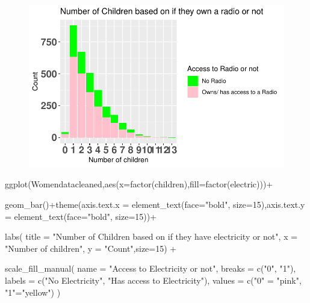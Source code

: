 \documentclass[
  letterpaper,
  DIV=11,
  numbers=noendperiod]{scrartcl}
\newenvironment{Shaded}{\begin{snugshade}}{\end{snugshade}}
\newcommand{\AttributeTok}[1]{\textcolor[rgb]{0.40,0.45,0.13}{#1}}
\newcommand{\DecValTok}[1]{\textcolor[rgb]{0.68,0.00,0.00}{#1}}
\newcommand{\FunctionTok}[1]{\textcolor[rgb]{0.28,0.35,0.67}{#1}}
\newcommand{\NormalTok}[1]{\textcolor[rgb]{0.00,0.23,0.31}{#1}}
\newcommand{\OtherTok}[1]{\textcolor[rgb]{0.00,0.23,0.31}{#1}}
\newcommand{\SpecialCharTok}[1]{\textcolor[rgb]{0.37,0.37,0.37}{#1}}
\newcommand{\StringTok}[1]{\textcolor[rgb]{0.13,0.47,0.30}{#1}}
\begin{document}
\begin{figure}[H]

{\centering \includegraphics{Fertility_Rates_Education_Impact_Botswana_files/figure-pdf/unnamed-chunk-20-1.pdf}

}

\end{figure}

\begin{Shaded}
\begin{Highlighting}[]
\FunctionTok{ggplot}\NormalTok{(Womendatacleaned,}\FunctionTok{aes}\NormalTok{(}\AttributeTok{x=}\FunctionTok{factor}\NormalTok{(children),}\AttributeTok{fill=}\FunctionTok{factor}\NormalTok{(electric)))}\SpecialCharTok{+}
  
\FunctionTok{geom\_bar}\NormalTok{()}\SpecialCharTok{+}\FunctionTok{theme}\NormalTok{(}\AttributeTok{axis.text.x =} \FunctionTok{element\_text}\NormalTok{(}\AttributeTok{face=}\StringTok{"bold"}\NormalTok{, }\AttributeTok{size=}\DecValTok{15}\NormalTok{),}\AttributeTok{axis.text.y =} \FunctionTok{element\_text}\NormalTok{(}\AttributeTok{face=}\StringTok{"bold"}\NormalTok{, }\AttributeTok{size=}\DecValTok{15}\NormalTok{))}\SpecialCharTok{+}
  
\FunctionTok{labs}\NormalTok{(}
    \AttributeTok{title =} \StringTok{"Number of Children based on if they have electricity or not"}\NormalTok{,}
    \AttributeTok{x =} \StringTok{"Number of children"}\NormalTok{,}
    \AttributeTok{y =} \StringTok{"Count"}\NormalTok{,}\AttributeTok{size=}\DecValTok{15}\NormalTok{) }\SpecialCharTok{+}
   
\FunctionTok{scale\_fill\_manual}\NormalTok{(}
    \AttributeTok{name =} \StringTok{"Access to Electricity or not"}\NormalTok{,}
    \AttributeTok{breaks =} \FunctionTok{c}\NormalTok{(}\StringTok{"0"}\NormalTok{, }\StringTok{"1"}\NormalTok{),}
    \AttributeTok{labels =} \FunctionTok{c}\NormalTok{(}\StringTok{"No Electricity"}\NormalTok{, }\StringTok{"Has access to Electricity"}\NormalTok{),}
    \AttributeTok{values =} \FunctionTok{c}\NormalTok{(}\StringTok{"0"} \OtherTok{=} \StringTok{"pink"}\NormalTok{, }\StringTok{"1"}\OtherTok{=}\StringTok{"yellow"}\NormalTok{)}
\NormalTok{  )}
\end{Highlighting}
\end{Shaded}
\end{document}
